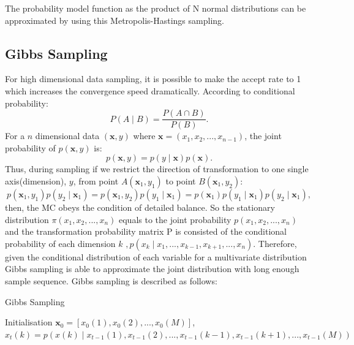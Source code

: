 \documentclass[11pt,twoside,a4paper]{article}
\begin{document}
	The probability model function as the product of N normal distributions can be approximated by using this Metropolis-Hastings sampling.
\subsection{Gibbs Sampling}
	\label{sec:Gibbs}
	For high dimensional data sampling, it is possible to make the accept rate to 1 which increases the convergence speed dramatically.
	According to conditional probability:
	\begin{equation}
		P(A \mid B) = \frac{P(A \cap B)}{P(B)}.
	\end{equation}
	For a $ n $ dimensional data $ (\mathbf{x}, y) $ where $ \mathbf{x}=(x_1,x_2,...,x_{n-1}) $, the joint probability of $p(\mathbf{x},y)$ is:
	\begin{equation}
		p(\mathbf{x},y) = p(y \mid \mathbf{x})p(\mathbf{x}).
	\end{equation}
	Thus, during sampling if we restrict the direction of transformation to one single axis(dimension), $ y $, from point $ A(\mathbf{x}_1, y_1) $ to point $ B(\mathbf{x}_1, y_2)$:
	\begin{equation}
		p(\mathbf{x}_1, y_1)p(y_2 \mid \mathbf{x}_1) = p(\mathbf{x}_1, y_2)p(y_1 \mid \mathbf{x}_1) = p(\mathbf{x}_1)p(y_1 \mid \mathbf{x}_1)p(y_2 \mid \mathbf{x}_1),
	\end{equation}
	then, the MC obeys the condition of detailed balance.
	So the stationary distribution $ \pi(x_1,x_2,...,x_n) $ equals to the joint probability $ p(x_1,x_2,...,x_n) $ and the transformation probability matrix P is consisted of the conditional probability of each dimension $ k $ $,  p(x_k \mid x_1,...,x_{k-1},x_{k+1},...,x_n) $.
	Therefore, given the conditional distribution of each variable for a multivariate distribution Gibbs sampling is able to approximate the joint distribution with long enough sample sequence.
	Gibbs sampling is described as follows:
	\begin{algorithm}[h]
	  \caption{Gibbs Sampling}
	  \label{alg:gibbs}
	  \begin{algorithmic}
	  	
	    \State Initialisation $\mathbf{x}_0 = [x_0(1),x_0(2),...,x_0(M)]$,  
	    		\State $ x_t(k) = p(x(k) \mid x_{t-1}(1),x_{t-1}(2),...,x_{t-1}(k-1),x_{t-1}(k+1),...,x_{t-1}(M))$\\
			\EndFor
		\EndFor
	  \end{algorithmic}
	\end{algorithm}
	
\end{document}

